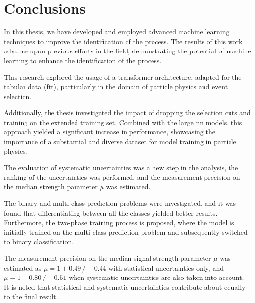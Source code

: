 \chapter*{Conclusions}
\label{ch:conclusions}

In this thesis, we have developed and employed advanced machine learning techniques to improve the identification of the
\tth process. The results of this work advance upon previous efforts in the field, demonstrating the potential of
machine learning to enhance the identification of the \tth process.

This research explored the usage of a transformer architecture, adapted for the tabular data (\gls{ftt}),
particularly in the domain of particle physics and event selection.

Additionally, the thesis investigated the impact of dropping the selection cuts and training on the extended training
set. Combined with the large \gls{nn} models, this approach yielded a significant increase in performance, showcasing
the importance of a substantial and diverse dataset for model training in particle physics.

The evaluation of systematic uncertainties was a new step in the \tth analysis, the ranking of the uncertainties was
performed, and the measurement precision on the median strength parameter $\mu$ was estimated.


The binary and multi-class prediction problems were investigated, and it was found that differentiating between all the
classes yielded better results. Furthermore, the two-phase training process is proposed, where the model is initially
trained on the multi-class prediction problem and subsequently switched to binary classification.

The measurement precision on the median signal strength parameter $\mu$ was estimated as ${\mu = 1 +0.49\,/ -0.44}$ with
statistical uncertainties only, and ${\mu = 1 + 0.80\,/- 0.51}$ when systematic uncertainties are also taken into
account. It is noted that statistical and systematic uncertainties contribute about equally to the final result.